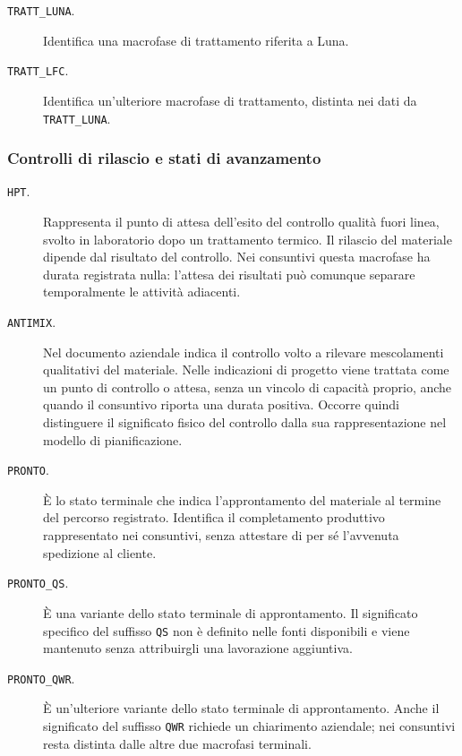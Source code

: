 \begin{description}
\item[\texttt{TRATT\_LUNA}.] Identifica una macrofase di trattamento riferita a Luna.

\item[\texttt{TRATT\_LFC}.] Identifica un'ulteriore macrofase di trattamento, distinta nei dati da \texttt{TRATT\_LUNA}.
\end{description}

\subsubsection{Controlli di rilascio e stati di avanzamento}

\begin{description}
\item[\texttt{HPT}.] Rappresenta il punto di attesa dell'esito del controllo qualità fuori linea, svolto in laboratorio dopo un trattamento termico. Il rilascio del materiale dipende dal risultato del controllo. Nei consuntivi questa macrofase ha durata registrata nulla: l'attesa dei risultati può comunque separare temporalmente le attività adiacenti.

\item[\texttt{ANTIMIX}.] Nel documento aziendale indica il controllo volto a rilevare mescolamenti qualitativi del materiale. Nelle indicazioni di progetto viene trattata come un punto di controllo o attesa, senza un vincolo di capacità proprio, anche quando il consuntivo riporta una durata positiva. Occorre quindi distinguere il significato fisico del controllo dalla sua rappresentazione nel modello di pianificazione.

\item[\texttt{PRONTO}.] È lo stato terminale che indica l'approntamento del materiale al termine del percorso registrato. Identifica il completamento produttivo rappresentato nei consuntivi, senza attestare di per sé l'avvenuta spedizione al cliente.

\item[\texttt{PRONTO\_QS}.] È una variante dello stato terminale di approntamento. Il significato specifico del suffisso \texttt{QS} non è definito nelle fonti disponibili e viene mantenuto senza attribuirgli una lavorazione aggiuntiva.

\item[\texttt{PRONTO\_QWR}.] È un'ulteriore variante dello stato terminale di approntamento. Anche il significato del suffisso \texttt{QWR} richiede un chiarimento aziendale; nei consuntivi resta distinta dalle altre due macrofasi terminali.
\end{description}

